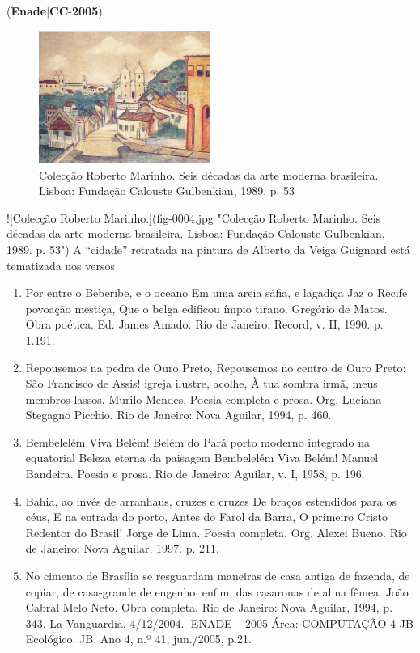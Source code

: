 \documentclass{exam}
\begin{document}
\begin{questions}
\question (\textbf{Enade}$|$\textbf{CC}-\textbf{2005}) \begin{figure}[H]
	\begin{center}
		\includegraphics[width=0.5\textwidth]{CIENCIA_DA_COMPUTACAO_Prova2005-utf8_figuras/fig-0004.jpg}
		\caption{Colecção Roberto Marinho. Seis décadas da arte moderna brasileira. Lisboa: Fundação Calouste Gulbenkian, 1989. p. 53}
	\end{center}
\end{figure}
![Colecção Roberto Marinho.](fig-0004.jpg "Colecção Roberto Marinho. Seis décadas da arte moderna brasileira. Lisboa: Fundação Calouste Gulbenkian, 1989. p. 53")
A “cidade” retratada na pintura de Alberto da Veiga Guignard está
tematizada nos versos
	\begin{enumerate}[label=\alph*)]
		\item  Por entre o Beberibe, e o oceano
Em uma areia sáfia, e lagadiça
Jaz o Recife povoação mestiça,
Que o belga edificou ímpio tirano.
Gregório de Matos. Obra poética. Ed. James
Amado. Rio de Janeiro: Record, v. II, 1990. p. 1.191.
		\item  Repousemos na pedra de Ouro Preto,
Repousemos no centro de Ouro Preto:
São Francisco de Assis! igreja ilustre, acolhe,
À tua sombra irmã, meus membros lassos.
Murilo Mendes. Poesia completa e prosa. Org. Luciana
Stegagno Picchio. Rio de Janeiro: Nova Aguilar, 1994, p. 460.
		\item  Bembelelém
Viva Belém!
Belém do Pará porto moderno integrado na equatorial
Beleza eterna da paisagem
Bembelelém
Viva Belém!
Manuel Bandeira. Poesia e prosa. Rio
de Janeiro: Aguilar, v. I, 1958, p. 196.
		\item  Bahia, ao invés de arranhaus, cruzes e cruzes
De braços estendidos para os céus,
E na entrada do porto,
Antes do Farol da Barra,
O primeiro Cristo Redentor do Brasil!
Jorge de Lima. Poesia completa. Org. Alexei
Bueno. Rio de Janeiro: Nova Aguilar, 1997. p. 211.
		\item  No cimento de Brasília se resguardam
maneiras de casa antiga de fazenda,
de copiar, de casa-grande de engenho,
enfim, das casaronas de alma fêmea.
João Cabral Melo Neto. Obra completa. Rio
de Janeiro: Nova Aguilar, 1994, p. 343.
La Vanguardia, 4/12/2004.
ENADE – 2005 Área: COMPUTAÇÃO 4
JB Ecológico. JB, Ano 4, n.º 41, jun./2005, p.21.


\end{enumerate}
\end{questions}
\end{document}

